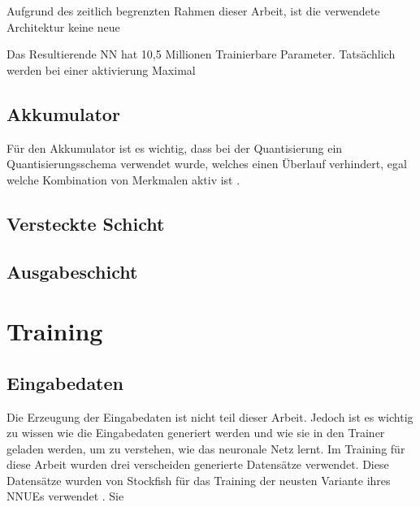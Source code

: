 Aufgrund des zeitlich begrenzten Rahmen dieser Arbeit, ist die verwendete Architektur keine neue

Das Resultierende \ac{NN} hat 10,5 Millionen Trainierbare Parameter. Tatsächlich werden bei einer aktivierung Maximal


\subsection{Akkumulator}


Für den Akkumulator ist es wichtig, dass bei der Quantisierung ein Quantisierungsschema verwendet wurde, welches einen Überlauf verhindert, egal welche Kombination von Merkmalen aktiv ist \cite{StockfishNNUE}.

\subsection{Versteckte Schicht}

\subsection{Ausgabeschicht}


\section{Training}

\subsection{Eingabedaten}

Die Erzeugung der Eingabedaten ist nicht teil dieser Arbeit. Jedoch ist es wichtig zu wissen wie die Eingabedaten generiert werden und wie sie in den Trainer geladen werden, um zu verstehen, wie das neuronale Netz lernt. Im Training für diese Arbeit wurden drei verscheiden generierte Datensätze verwendet. Diese Datensätze wurden von Stockfish für das Training der neusten Variante ihres \acp{NNUE} verwendet \cite{StockfishNewestNetJul04}. Sie


